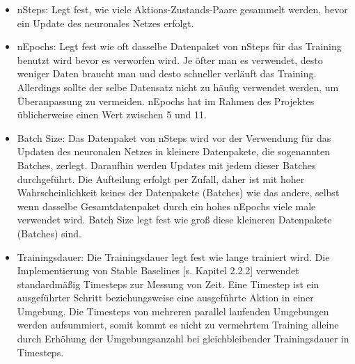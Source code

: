 \begin{itemize}
\item nSteps: Legt fest, wie viele Aktions-Zustands-Paare gesammelt werden, bevor ein Update des neuronales Netzes erfolgt.

\item nEpochs: Legt fest wie oft dasselbe Datenpaket von nSteps für das Training benutzt wird bevor es verworfen wird. Je öfter man es verwendet, desto weniger Daten braucht man und desto schneller verläuft das Training. Allerdings sollte der selbe Datensatz nicht zu häufig verwendet werden, um Überanpassung zu vermeiden. nEpochs hat im Rahmen des Projektes üblicherweise einen Wert zwischen 5 und 11.

\item Batch Size: Das Datenpaket von nSteps wird vor der Verwendung für das Updaten des neuronalen Netzes in kleinere Datenpakete, die sogenannten Batches, zerlegt. Daraufhin werden Updates mit jedem dieser Batches durchgeführt. Die Aufteilung erfolgt per Zufall, daher ist mit hoher Wahrscheinlichkeit keines der Datenpakete (Batches) wie das andere, selbst wenn dasselbe Gesamtdatenpaket durch ein hohes nEpochs viele male verwendet wird. Batch Size legt fest wie groß diese kleineren Datenpakete (Batches) sind.

\item 
Trainingsdauer: Die Trainingsdauer legt fest wie lange trainiert wird. Die Implementierung von Stable Baselines [s. Kapitel 2.2.2] verwendet standardmäßig Timesteps zur Messung von Zeit. Eine Timestep ist ein ausgeführter Schritt beziehungsweise eine ausgeführte Aktion in einer Umgebung. Die Timesteps von mehreren parallel laufenden Umgebungen werden aufsummiert, somit kommt es nicht zu vermehrtem Training alleine durch Erhöhung der Umgebungsanzahl bei gleichbleibender Trainingsdauer in Timesteps.
\end{itemize}